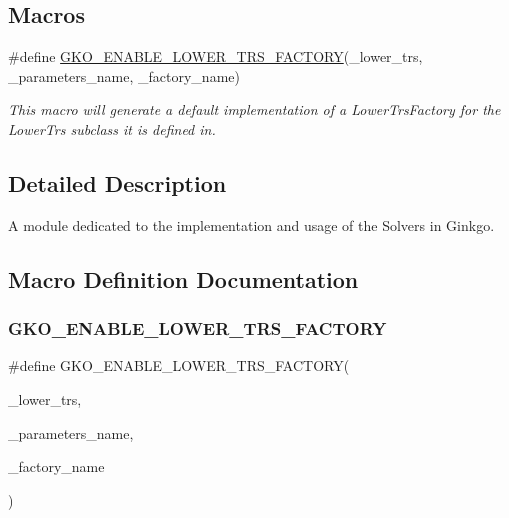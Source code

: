 \subsection*{Macros}
\begin{DoxyCompactItemize}
\item 
\#define \hyperlink{group__solvers_gabf1eb23a724c8a60ce34cd1cbc0bb5ba}{G\+K\+O\+\_\+\+E\+N\+A\+B\+L\+E\+\_\+\+L\+O\+W\+E\+R\+\_\+\+T\+R\+S\+\_\+\+F\+A\+C\+T\+O\+RY}(\+\_\+lower\+\_\+trs,  \+\_\+parameters\+\_\+name,  \+\_\+factory\+\_\+name)
\begin{DoxyCompactList}\small\item\em This macro will generate a default implementation of a Lower\+Trs\+Factory for the Lower\+Trs subclass it is defined in. \end{DoxyCompactList}\end{DoxyCompactItemize}


\subsection{Detailed Description}
A module dedicated to the implementation and usage of the Solvers in Ginkgo. 



\subsection{Macro Definition Documentation}
\mbox{\label{group__solvers_gabf1eb23a724c8a60ce34cd1cbc0bb5ba}} 
\subsubsection{\texorpdfstring{G\+K\+O\+\_\+\+E\+N\+A\+B\+L\+E\+\_\+\+L\+O\+W\+E\+R\+\_\+\+T\+R\+S\+\_\+\+F\+A\+C\+T\+O\+RY}{GKO\_ENABLE\_LOWER\_TRS\_FACTORY}}
{\footnotesize\ttfamily \#define G\+K\+O\+\_\+\+E\+N\+A\+B\+L\+E\+\_\+\+L\+O\+W\+E\+R\+\_\+\+T\+R\+S\+\_\+\+F\+A\+C\+T\+O\+RY(\begin{DoxyParamCaption}\item[{}]{\+\_\+lower\+\_\+trs,  }\item[{}]{\+\_\+parameters\+\_\+name,  }\item[{}]{\+\_\+factory\+\_\+name }\end{DoxyParamCaption})}

